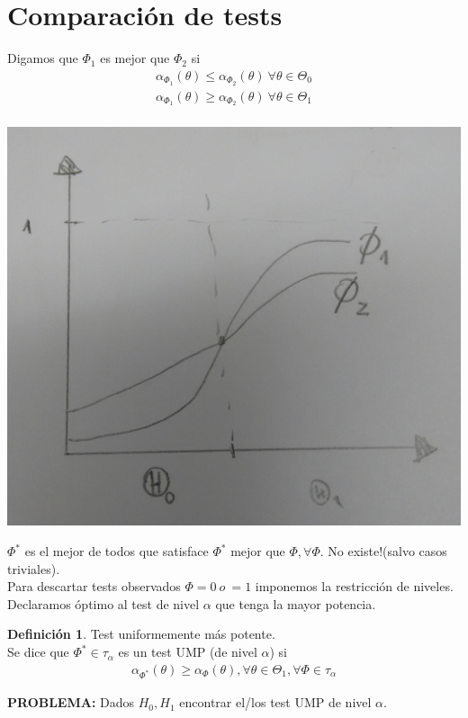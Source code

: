 \documentclass[10pt]{article}
\theoremstyle{plain}
\theoremstyle{definition}
\newtheorem{defi}{Definición}
\begin{document}
\section{Comparación de tests}
Digamos que $\Phi_{1}$ es mejor que $\Phi_{2}$ si 
\begin{align*}
\alpha_{\Phi_{1}}(\theta) \le \alpha_{\Phi_{2}}(\theta)\ \forall \theta \in \Theta_{0}\\
\alpha_{\Phi_{1}}(\theta) \ge \alpha_{\Phi_{2}}(\theta)\ \forall \theta \in \Theta_{1}\\
\end{align*}
\begin{center}
\includegraphics[scale=0.2]{imagenes/test2.jpg}
\end{center}
$\Phi^*$ es el mejor de todos que satisface $\Phi^*$ mejor que $\Phi, \forall \Phi$. No existe!(salvo casos triviales).\\
Para descartar tests observados $\Phi = 0\ o \ = 1$ imponemos la restricción de niveles. Declaramos óptimo al test de nivel $\alpha$ que tenga la mayor potencia.
\begin{defi} Test uniformemente más potente.\\
Se dice que $\Phi^* \in \tau_{\alpha}$ es un test UMP (de nivel $\alpha$) si
\begin{align*}
\alpha_{\Phi^*}(\theta) \ge \alpha_{\Phi}(\theta), \forall \theta \in \Theta_{1}, \forall \Phi \in \tau_{\alpha}
\end{align*}
\end{defi}
\textbf{PROBLEMA: } Dados $H_{0}, H_{1}$ encontrar el/los test UMP de nivel $\alpha$.\\
\end{document}
